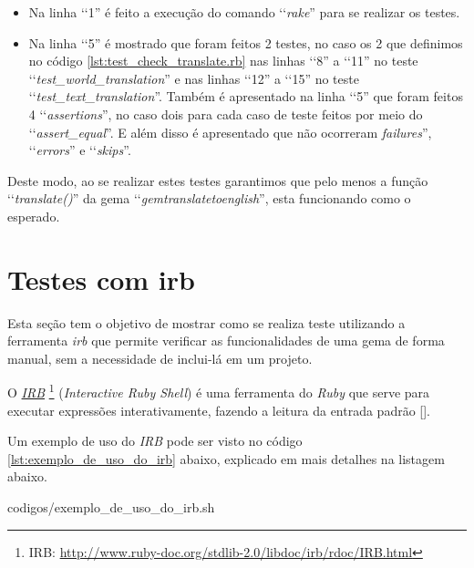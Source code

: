 \begin{itemize}

 \item Na linha ‘‘1'' é feito a execução do comando ‘‘\emph{rake}'' para se realizar os testes.

 \item Na linha ‘‘5'' é mostrado que foram feitos 2 testes, no caso os 2 que definimos no código
 \ref{lst:test_check_translate.rb} nas linhas ‘‘8'' a ‘‘11'' no teste ‘‘\emph{test\_world\_translation}''
 e nas linhas ‘‘12'' a ‘‘15'' no teste ‘‘\emph{test\_text\_translation}''. Também é apresentado na
 linha ‘‘5'' que foram feitos 4 ‘‘\emph{assertions}'', no caso dois para cada caso de teste feitos por
 meio do ‘‘\emph{assert\_equal}''. E além disso é apresentado que não ocorreram  \emph{failures}'',
 ‘‘\emph{errors}'' e ‘‘\emph{skips}''.

\end{itemize}

Deste modo, ao se realizar estes testes garantimos que pelo menos a função ‘‘\emph{translate()}'' da gema
‘‘\emph{gemtranslatetoenglish}'', esta funcionando como o esperado.


\section{Testes com irb}
\label{section:teste_com_irb}


Esta seção tem o objetivo de mostrar como se realiza teste utilizando a ferramenta \emph{irb} que permite
verificar as funcionalidades de uma gema de forma manual, sem a necessidade de inclui-lá em um projeto.

O \emph{\href{http://www.ruby-doc.org/stdlib-2.0/libdoc/irb/rdoc/IRB.html}{IRB}}
\footnote{IRB: \url{http://www.ruby-doc.org/stdlib-2.0/libdoc/irb/rdoc/IRB.html}}
(\emph{Interactive Ruby Shell}) é uma ferramenta do \emph{Ruby} que serve para executar expressões
interativamente, fazendo a leitura da entrada padrão [].

Um exemplo de uso do \emph{IRB} pode ser visto
no código \ref{lst:exemplo_de_uso_do_irb}
abaixo, explicado em mais detalhes na listagem abaixo.



{codigos/exemplo_de_uso_do_irb.sh}

